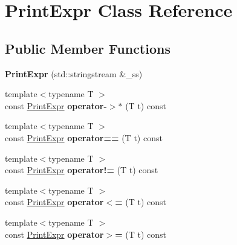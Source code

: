 \hypertarget{classPrintExpr}{\section{Print\-Expr Class Reference}
\label{classPrintExpr}
}
\subsection*{Public Member Functions}
\begin{DoxyCompactItemize}
\item 
\hypertarget{classPrintExpr_ae1ae8ee1a33d8e9e329333c7e494b504}{{\bfseries Print\-Expr} (std\-::stringstream \&\-\_\-ss)}\label{classPrintExpr_ae1ae8ee1a33d8e9e329333c7e494b504}

\item 
\hypertarget{classPrintExpr_a6be8ffbd474b41ef21c643e53c6ea9c4}{{\footnotesize template$<$typename T $>$ }\\const \hyperlink{classPrintExpr}{Print\-Expr} {\bfseries operator-\/$>$$\ast$} (T t) const }\label{classPrintExpr_a6be8ffbd474b41ef21c643e53c6ea9c4}

\item 
\hypertarget{classPrintExpr_ae776115f1d3ec35eb83bad13ebc25929}{{\footnotesize template$<$typename T $>$ }\\const \hyperlink{classPrintExpr}{Print\-Expr} {\bfseries operator==} (T t) const }\label{classPrintExpr_ae776115f1d3ec35eb83bad13ebc25929}

\item 
\hypertarget{classPrintExpr_aee5f096069cab38b8aeeb00b4aa7ba6e}{{\footnotesize template$<$typename T $>$ }\\const \hyperlink{classPrintExpr}{Print\-Expr} {\bfseries operator!=} (T t) const }\label{classPrintExpr_aee5f096069cab38b8aeeb00b4aa7ba6e}

\item 
\hypertarget{classPrintExpr_a39dc1e7b405f0f834e8a45cfd4764853}{{\footnotesize template$<$typename T $>$ }\\const \hyperlink{classPrintExpr}{Print\-Expr} {\bfseries operator$<$=} (T t) const }\label{classPrintExpr_a39dc1e7b405f0f834e8a45cfd4764853}

\item 
\hypertarget{classPrintExpr_a334a34dda07abd9aea48a6e41a8e165e}{{\footnotesize template$<$typename T $>$ }\\const \hyperlink{classPrintExpr}{Print\-Expr} {\bfseries operator$>$=} (T t) const }\label{classPrintExpr_a334a34dda07abd9aea48a6e41a8e165e}


\end{DoxyCompactItemize}
